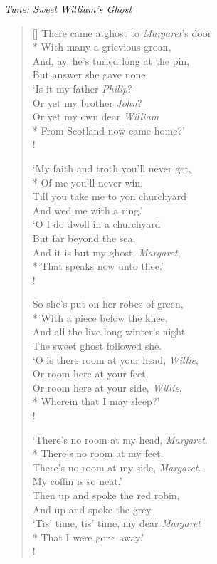\documentclass[MAIN]{subfiles}
\begin{document}
\begin{center}
\emph{Tune: Sweet William's Ghost}
\end{center}

\bigskip

\settowidth{\versewidth}{And, ay, he's turled long at the pin,}
\begin{verse}[\versewidth]
There came a ghost to \emph{Margaret}'s door\\*
With many a grievious groan,\\
And, ay, he's turled long at the pin,\\
But answer she gave none.\\
`Is it my father \emph{Philip}?\\
Or yet my brother \emph{John}?\\
Or yet my own dear \emph{William}\\*
From Scotland now came home?'\\!

`My faith and troth you'll never get,\\*
Of me you'll never win,\\
Till you take me to yon churchyard\\
And wed me with a ring.'\\
`O I do dwell in a churchyard\\
But far beyond the sea,\\
And it is but my ghost, \emph{Margaret},\\*
That speaks now unto thee.'\\!

So she's put on her robes of green,\\*
With a piece below the knee,\\
And all the live long winter's night\\
The sweet ghost followed she.\\
`O is there room at your head, \emph{Willie},\\
Or room here at your feet,\\
Or room here at your side, \emph{Willie},\\*
Wherein that I may sleep?'\\!

`There's no room at my head, \emph{Margaret}.\\*
There's no room at my feet.\\
There's no room at my side, \emph{Margaret}.\\
My coffin is so neat.'\\
Then up and spoke the red robin,\\
And up and spoke the grey.\\
`Tis' time, tis' time, my dear \emph{Margaret}\\*
That I were gone away.'\\!


\end{verse}
\end{document}
